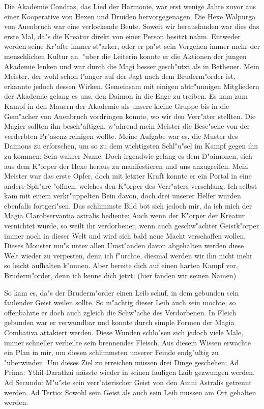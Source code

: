 \documentclass[a5paper,8pt]{book}
\begin{document}
Die Akademie Condras, das Lied der Harmonie, war erst wenige Jahre zuvor aus einer Kooperative von Hexen und Druiden hervorgegenagen. Die Hexe Walpurga von Auenbruch war eine verlockende Beute. Soweit wir herausfanden war dies das erste Mal, da"s die Kreatur direkt von einer Person besitzt nahm. Entweder werden seine Kr"afte immer st"arker, oder er pa"st sein Vorgehen immer mehr der menschlichen Kultur an. "uber die Leiterin konnte er die Aktionen der jungen Akademie lenken und war durch die Magi besser gesch"utzt als in Betheuer. Mein Meister, der wohl schon l"anger auf der Jagt nach dem Bruderm"order ist, erkannte jedoch dessen Wirken. Gemeinsam mit einigen abtr"unnigen Mitgliedern der Akademie gelang es uns, den Daimon in die Enge zu treiben. Es kam zum Kampf in den Mauern der Akademie als unsere kleine Gruppe bis in die Gem"acher von Auenbruch vordringen konnte, wo wir den Verr"ater stellten.
Die Magier sollten ihn besch"aftigen, w"ahrend mein Meister die Bese"sene von der verderbten Pr"asenz reinigen wollte. Meine Aufgabe war es, die Muster des Daimons zu erforschen, um so zu dem wichtigsten Schl"u"sel im Kampf gegen ihn zu kommen: Sein wahrer Name.
Doch irgendwie gelang es dem D"aimonen, sich aus dem K"orper der Hexe heraus zu manifestieren und uns anzugreifen. Mein Meister war das erste Opfer, doch mit letzter Kraft konnte er ein Portal in eine andere Sph"are "offnen, welches den K"orper des Verr"aters verschlang. Ich selbst kam mit einem verkr"uppelten Bein davon, doch drei unserer Helfer wurden ebenfalls fortgeri"sen. Das schlimmste Bild bot sich jedoch mir, da ich mich der Magia Clarobservantia astralis bediente: Auch wenn der K"orper der Kreatur vernichtet wurde, so weilt ihr verdorbener, wenn auch geschw"achter Geistk"orper immer noch in dieser Welt und wird sich bald neue Macht verschaffen wollen. Dieses Monster mu"s unter allen Umst"anden davon abgehalten werden diese Welt wieder zu verpesten, denn ich f"urchte, diesmal werden wir ihn nicht mehr so leicht aufhalten k"onnen. Aber bereite dich auf einen harten Kampf vor, Bruderm"order, denn ich kenne dich jetzt: (hier fanden wir seinen Namen)

\vspace{10mm}

So kam es, da"s der Bruderm"order einen Leib schuf, in dem gebunden sein faulender Geist weilen sollte.
So m"achtig dieser Leib auch sein mochte, so offenbahrte er doch auch zgleich die Schw"ache des Verdorbenen.
In Fleich gebunden war er verwundbar und konnte durch simple Formen der Magia Combativa attakiert werden.
Diese Wunden schlo"sen sich jedoch viele Male, immer schneller verheilte sein brennendes Fleisch. Aus diesem Wissen erwachte ein Plan in mir, um diesen schlimmsten unserer Feinde endg"ultig zu "uberwinden. Um dieses Ziel zu erreichen müssen drei Dinge geschehen:
Ad Prima: Ythil-Darathai müsste wieder in seinen fauligen Laib gezwungen werden.
Ad Secundo: M"u"ste sein verr"aterischer Geist von den Amni Astralis getrennt werden.
Ad Tertio: Sowohl sein Geist als auch sein Leib müssen am Ort gehalten werden.
\end{document}
